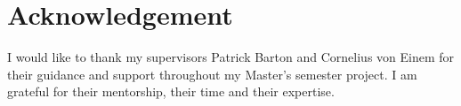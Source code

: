 \chapter*{Acknowledgement}


I would like to thank my supervisors Patrick Barton and Cornelius von Einem for their guidance and support throughout my Master's semester project. I am grateful for their mentorship, their time and their expertise.

